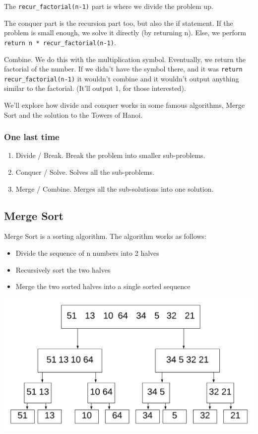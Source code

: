 \documentclass{article}
\newcommand{\code}[1]{\texttt{#1}}
\begin{document}
The \code{recur\_factorial(n-1)} part is where we divide the problem up.

The conquer part is the recursion part too, but also the if statement. If the problem is small enough, we solve it directly (by returning n). Else, we perform \code{return n * recur\_factorial(n-1)}.

Combine. We do this with the multiplication symbol. Eventually, we return the factorial of the number. If we didn't have the symbol there, and it was \code{return recur\_factorial(n-1)} it wouldn't combine and it wouldn't output anything similar to the factorial. (It'll output 1, for those interested).

We'll explore how divide and conquer works in some famous algorithms, Merge Sort and the solution to the Towers of Hanoi.

\subsubsection{One last time}
\begin{enumerate}
    \item Divide / Break. Break the problem into smaller sub-problems.
    \item Conquer / Solve. Solves all the sub-problems.
    \item Merge / Combine. Merges all the sub-solutions into one solution.
\end{enumerate}
\newpage
\subsection{Merge Sort}

Merge Sort is a sorting algorithm. The algorithm works as follows:
\begin{itemize}
    \item Divide the sequence of n numbers into 2 halves
    \item Recursively sort the two halves
    \item Merge the two sorted halves into a single sorted sequence
\end{itemize}

\includegraphics[width=\textwidth,height=\textheight,keepaspectratio]{g.png}
\end{document}

